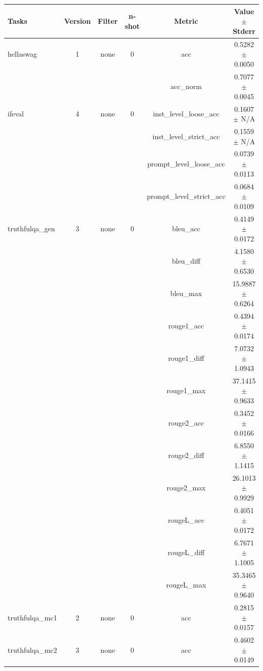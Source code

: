 \documentclass{ifacconf}
\begin{document}
	\vfill
	\clearpage
	\pagebreak
	
	\begin{strip}
		\begin{minipage}{\textwidth}
			\begin{table}[H]
				\centering
				\begin{tabular}{|l|c|c|c|c|c|}
					\hline
					\textbf{Tasks} & \textbf{Version} & \textbf{Filter} & \textbf{n-shot} & \textbf{Metric} & \textbf{Value} $\pm$ \textbf{Stderr} \\ \hline
					hellaswag & 1 & none & 0 & acc & 0.5282 $\pm$ 0.0050 \\ \hline
					& & & & acc\_norm & 0.7077 $\pm$ 0.0045 \\ \hline
					ifeval & 4 & none & 0 & inst\_level\_loose\_acc & 0.1607 $\pm$ N/A \\ \hline
					& & & & inst\_level\_strict\_acc & 0.1559 $\pm$ N/A \\ \hline
					& & & & prompt\_level\_loose\_acc & 0.0739 $\pm$ 0.0113 \\ \hline
					& & & & prompt\_level\_strict\_acc & 0.0684 $\pm$ 0.0109 \\ \hline
					truthfulqa\_gen & 3 & none & 0 & bleu\_acc & 0.4149 $\pm$ 0.0172 \\ \hline
					& & & & bleu\_diff & 4.1580 $\pm$ 0.6530 \\ \hline
					& & & & bleu\_max & 15.9887 $\pm$ 0.6264 \\ \hline
					& & & & rouge1\_acc & 0.4394 $\pm$ 0.0174 \\ \hline
					& & & & rouge1\_diff & 7.0732 $\pm$ 1.0943 \\ \hline
					& & & & rouge1\_max & 37.1415 $\pm$ 0.9633 \\ \hline
					& & & & rouge2\_acc & 0.3452 $\pm$ 0.0166 \\ \hline
					& & & & rouge2\_diff & 6.8550 $\pm$ 1.1415 \\ \hline
					& & & & rouge2\_max & 26.1013 $\pm$ 0.9929 \\ \hline
					& & & & rougeL\_acc & 0.4051 $\pm$ 0.0172 \\ \hline
					& & & & rougeL\_diff & 6.7671 $\pm$ 1.1005 \\ \hline
					& & & & rougeL\_max & 35.3465 $\pm$ 0.9640 \\ \hline
					truthfulqa\_mc1 & 2 & none & 0 & acc & 0.2815 $\pm$ 0.0157 \\ \hline
					truthfulqa\_mc2 & 3 & none & 0 & acc & 0.4602 $\pm$ 0.0149 \\ \hline
				\end{tabular}
				\label{tab:llama31_q5km}
			\end{table}
			

\end{minipage}
\end{strip}
\end{document}
